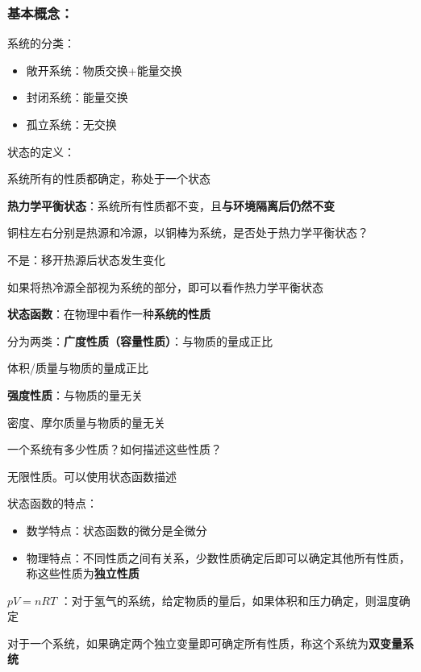\subsubsection*{基本概念：}%
\label{subsub*:基本概念：}
系统的分类：
\begin{itemize}
    \item 敞开系统：物质交换+能量交换
    \item 封闭系统：能量交换
    \item 孤立系统：无交换
    
\end{itemize}
状态的定义：
\begin{defi}
    系统所有的性质都确定，称处于一个状态
\end{defi}
\begin{notation}
    \textbf{热力学平衡状态}：系统所有性质都不变，且\textbf{与环境隔离后仍然不变}
\end{notation}
\begin{question}
    铜柱左右分别是热源和冷源，以铜棒为系统，是否处于热力学平衡状态？
\end{question}
\begin{sol}
    不是：移开热源后状态发生变化
\end{sol}
如果将热冷源全部视为系统的部分，即可以看作热力学平衡状态
\begin{defi}
    \textbf{状态函数}：在物理中看作一种\textbf{系统的性质}
\end{defi}
分为两类：\textbf{广度性质（容量性质）}：与物质的量成正比
\begin{eg}
    体积/质量与物质的量成正比
\end{eg}
\textbf{强度性质}：与物质的量无关
\begin{eg}
    密度、摩尔质量与物质的量无关
\end{eg}
\begin{question}
一个系统有多少性质？如何描述这些性质？
\end{question}
\begin{sol}
    无限性质。可以使用状态函数描述
\end{sol}
状态函数的特点：
\begin{itemize}
    \item 数学特点：状态函数的微分是全微分
    \item 物理特点：不同性质之间有关系，少数性质确定后即可以确定其他所有性质，称这些性质为\textbf{独立性质}
    
\end{itemize}
\begin{eg}
$pV=nRT$ ：对于氢气的系统，给定物质的量后，如果体积和压力确定，则温度确定
\end{eg}
对于一个系统，如果确定两个独立变量即可确定所有性质，称这个系统为\textbf{双变量系统}
